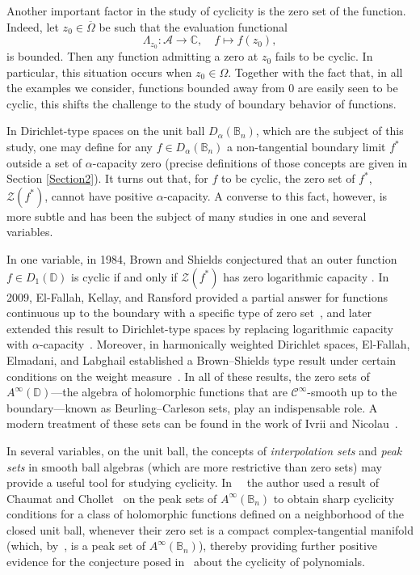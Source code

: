 \documentclass[a4paper,12pt]{amsart}
\theoremstyle{definition}
\theoremstyle{remark}
\def\D{\mathbb D}
\def\Bn{\mathbb{B}_n}
\begin{document}
        Another important factor in the study of cyclicity is the zero set of the function. Indeed, let $z_0 \in \overline{\Omega}$ be such that the evaluation functional
        \begin{equation*}
            \Lambda_{z_0} : \mathcal{A} \to \mathbb{C}, \quad f \mapsto f(z_0),
        \end{equation*}
        is bounded. Then any function admitting a zero at $z_0$ fails to be cyclic. In particular, this situation occurs when $z_0 \in \Omega$. Together with the fact that, in all the examples we consider,
functions bounded away from $0$ are easily seen to be cyclic,
this shifts the challenge to the study of boundary behavior of functions. 
        
        In Dirichlet-type spaces on the unit ball $D_\alpha(\Bn)$, which are the subject of this study, one may define for any $f \in D_\alpha(\Bn)$ a non-tangential boundary limit $f^*$ outside a set of $\alpha$-capacity zero \cite{ChalmoukisHartz2024} (precise
definitions of those concepts are given in Section 
\ref{Section2}). It turns out that, for $f$ to be cyclic, the zero set of $f^*$, $\mathcal{Z}(f^*)$, cannot have positive $\alpha$-capacity. A converse to this fact, however, is more subtle and has been the subject of many studies in one and several variables.
        
        In one variable, in 1984, Brown and Shields conjectured that an outer function $f \in D_1(\D)$ is cyclic if and only if $\mathcal{Z}(f^*)$ has zero logarithmic capacity \cite{BS84}. In 2009, El-Fallah, Kellay, and Ransford provided a partial answer for functions continuous up to the boundary with a specific type of zero set~\cite{ElFallah_BS_Conj}, and later extended this result to Dirichlet-type spaces by replacing logarithmic capacity with $\alpha$-capacity~\cite{ELFALLAH2010_Cantor}. Moreover, in harmonically weighted Dirichlet spaces, El-Fallah, Elmadani, and Labghail established a Brown--Shields type result under certain conditions on the weight measure~\cite{ELFALLAH_Dmu_BS}. In all of these results, the zero sets of $A^{\infty}(\D)$—the algebra of holomorphic functions that are $\mathcal{C}^{\infty}$-smooth up to the boundary—known as Beurling–Carleson sets, play an indispensable role. A modern treatment of these sets can be found in the work of Ivrii and Nicolau~\cite{IvriiNicolau_Beurling_Carleson_Set}. 
        
        In several variables, on the unit ball, the concepts of \emph{interpolation sets} and \emph{peak sets} in smooth ball algebras (which are more restrictive than zero sets) may provide a useful tool for studying cyclicity. In~~\cite{Pouriya_SecondPaper} the author used a result of Chaumat and Chollet~\cite{ChaumatChollet1979ensembles} on the peak sets of $A^{\infty}(\Bn)$ to obtain sharp cyclicity conditions for a class of holomorphic functions defined on a neighborhood of the closed unit ball, whenever their zero set is a compact complex-tangential manifold (which, by~\cite{ChaumatChollet1979ensembles}, is a peak set of $A^{\infty}(\Bn)$), thereby providing further positive evidence for the conjecture posed in~\cite[p. 3908]{VavitsasNonCyc} about the 
 cyclicity of polynomials.
\end{document}
